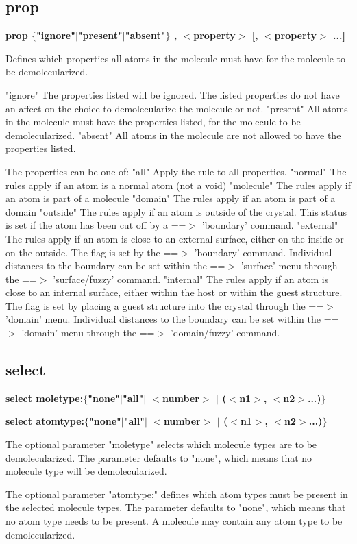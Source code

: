 \subsection*{prop}
{\bf prop $ \{$"ignore"$| $"present"$| $"absent"$\} $ , $ <$property$> $ [, $ <$property$> $ ...] \par }
\par
\vspace{3pt}
Defines which properties all atoms in the molecule must have 
for the molecule to be demolecularized. 
\par
"ignore" 
The properties listed will be ignored. The listed properties do 
not have an affect on the choice to demolecularize the molecule 
or not. 
"present" 
All atoms in the molecule must have the properties listed, 
for the molecule to be demolecularized. 
"absent" 
All atoms in the molecule are not allowed to have the 
properties listed. 
\par
The properties can be one of: 
"all" 
Apply the rule to all properties. 
"normal" 
The rules apply if an atom is a normal atom (not a void) 
"molecule" 
The rules apply if an atom is part of a molecule 
"domain" 
The rules apply if an atom is part of a domain 
"outside" 
The rules apply if an atom is outside of the crystal. This status 
is set if the atom has been cut off by a ==$> $ 'boundary' command. 
"external" 
The rules apply if an atom is close to an external surface, either 
on the inside or on the outside. 
The flag is set by the ==$> $ 'boundary' command. Individual distances 
to the boundary can be set within the ==$> $ 'surface' menu through 
the ==$> $ 'surface/fuzzy' command. 
"internal" 
The rules apply if an atom is close to an internal surface, either 
within the host or within the guest structure. 
The flag is set by placing a guest structure into the crystal through 
the ==$> $ 'domain' menu. Individual distances 
to the boundary can be set within the ==$> $ 'domain' menu through 
the ==$> $ 'domain/fuzzy' command. 
\subsection*{select}
{\bf select moletype:$ \{$"none"$| $"all"$| $ $ <$number$> $ $| $ ($ <$n1$> $, $ <$n2$> $...)$\} $ \par }
{\bf select atomtype:$ \{$"none"$| $"all"$| $ $ <$number$> $ $| $ ($ <$n1$> $, $ <$n2$> $...)$\} $ \par }
\par
\vspace{3pt}
The optional parameter "moletype" selects which molecule 
types are to be demolecularized. 
The parameter defaults to "none", which means that no 
molecule type will be demolecularized. 
\par
The optional parameter "atomtype:" defines which atom 
types must be present in the selected molecule types. 
The parameter defaults to "none", which means that no 
atom type needs to be present. A molecule may contain 
any atom type to be demolecularized. 
